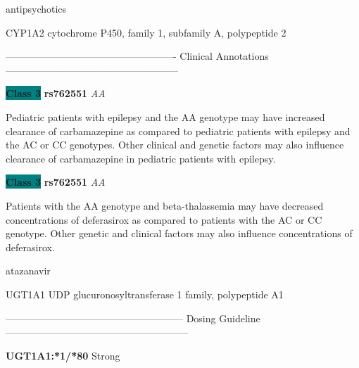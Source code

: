 \documentclass{resume} %
\begin{document}
\begin{rSection}{ antipsychotics }
\begin{rSubsection}{ CYP1A2 }{ cytochrome P450, family 1, subfamily A, polypeptide 2 }{}{}
\item[] ---------------------------------------------------- Clinical Annotations -----------------------------------------------------\newline
\item \textbf{\colorbox{teal} {Class 3}} \textbf{ rs762551 } \textit{ AA }
\item[] Pediatric patients with epilepsy and the AA genotype may have increased clearance of carbamazepine as compared to pediatric patients with epilepsy and the AC or CC genotypes. Other clinical and genetic factors may also influence clearance of carbamazepine in pediatric patients with epilepsy.\item \textbf{\colorbox{teal} {Class 3}} \textbf{ rs762551 } \textit{ AA }
\item[] Patients with the AA genotype and beta-thalassemia may have decreased concentrations of deferasirox as compared to patients with the AC or CC genotype. Other genetic and clinical factors may also influence concentrations of deferasirox.
\end{rSubsection}

\end{rSection}\begin{rSection}{ atazanavir }
\item[]

\begin{rSubsection}{ UGT1A1 }{ UDP glucuronosyltransferase 1 family, polypeptide A1 }{}{}
\item[]
\item[] ------------------------------------------------------ Dosing Guideline --------------------------------------------------------\newline
\item[] \textbf{ UGT1A1:*1/*80 } Strong


\end{rSubsection}
\end{rSection}
\end{document}
